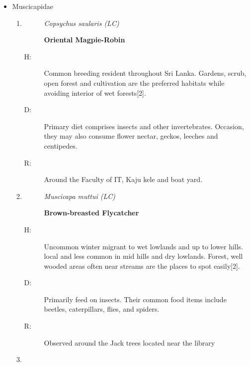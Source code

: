 \begin{itemize}
\begin{enumerate}
%
\end{enumerate}%
\item%
Muscicapidae%
\begin{enumerate}%
\item%
\begin{description}%
\item[]%
\textit{Copsychus saularis (LC)}%
\item[]%
\textbf{Oriental Magpie{-}Robin}%
\end{description}%
\begin{description}%
\item[H: ]%
Common breeding resident throughout Sri Lanka. Gardens, scrub, open forest and cultivation are the preferred habitats while avoiding interior of wet forests{[}2{]}.%
\item[D: ]%
Primary diet comprises insects and other invertebrates. Occasion, they may also consume flower nectar, geckos, leeches and centipedes.%
\item[R: ]%
Around the Faculty of IT, Kaju kele and boat yard.%
\end{description}%
\item%
\begin{description}%
\item[]%
\textit{Muscicapa muttui (LC)}%
\item[]%
\textbf{Brown{-}breasted Flycatcher}%
\end{description}%
\begin{description}%
\item[H: ]%
Uncommon winter migrant to wet lowlands and up to lower hills. local and less common in mid hills and dry lowlands. Forest, well wooded areas often near streams are the places to spot easily{[}2{]}.%
\item[D: ]%
Primarily feed on insects. Their common food items include beetles, caterpillars, flies, and spiders.%
\item[R: ]%
Observed around the Jack trees located near the library%
\end{description}%
\item%

\end{enumerate}
\end{itemize}
